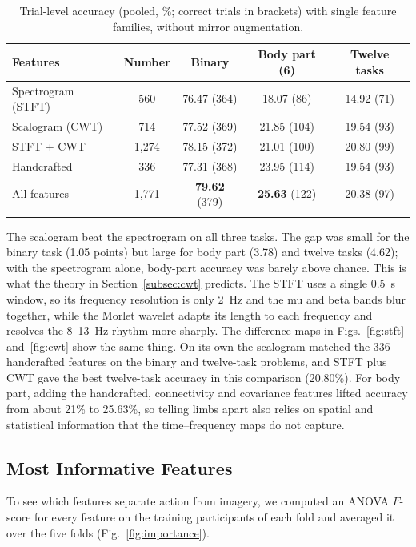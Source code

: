 \documentclass[pdflatex,sn-mathphys-num]{sn-jnl}%
\theoremstyle{thmstyleone}%
\theoremstyle{thmstyletwo}%
\theoremstyle{thmstylethree}%
\begin{document}
\begin{table}[htbp]
\centering
\caption{Trial-level accuracy (pooled, \%; correct trials in brackets) with single feature families, without mirror augmentation.}
\label{tab:families}
\footnotesize
\begin{tabular}{@{}lcccc@{}}
\toprule
Features & Number & Binary & Body part (6) & Twelve tasks \\
\midrule
Spectrogram (STFT) & 560 & 76.47 (364) & 18.07 (86) & 14.92 (71) \\
Scalogram (CWT) & 714 & 77.52 (369) & 21.85 (104) & 19.54 (93) \\
STFT + CWT & 1,274 & 78.15 (372) & 21.01 (100) & 20.80 (99) \\
Handcrafted & 336 & 77.31 (368) & 23.95 (114) & 19.54 (93) \\
All features & 1,771 & \textbf{79.62} (379) & \textbf{25.63} (122) & 20.38 (97) \\
\botrule
\end{tabular}
\end{table}

The scalogram beat the spectrogram on all three tasks. The gap was small for the binary task (1.05 points) but large for body part (3.78) and twelve tasks (4.62); with the spectrogram alone, body-part accuracy was barely above chance. This is what the theory in Section~\ref{subsec:cwt} predicts. The STFT uses a single 0.5~s window, so its frequency resolution is only 2~Hz and the mu and beta bands blur together, while the Morlet wavelet adapts its length to each frequency and resolves the 8--13~Hz rhythm more sharply. The difference maps in Figs.~\ref{fig:stft} and~\ref{fig:cwt} show the same thing. On its own the scalogram matched the 336 handcrafted features on the binary and twelve-task problems, and STFT plus CWT gave the best twelve-task accuracy in this comparison (20.80\%). For body part, adding the handcrafted, connectivity and covariance features lifted accuracy from about 21\% to 25.63\%, so telling limbs apart also relies on spatial and statistical information that the time--frequency maps do not capture.

\subsection{Most Informative Features}\label{subsec:importance}

To see which features separate action from imagery, we computed an ANOVA $F$-score for every feature on the training participants of each fold and averaged it over the five folds (Fig.~\ref{fig:importance}).
\end{document}
